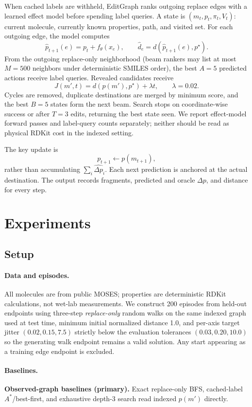 When cached labels are withheld, EditGraph ranks outgoing replace edges with a learned effect model before spending label queries. A state is $(m_t,p_t,\pi_t,V_t)$: current molecule, currently known properties, path, and visited set. For each outgoing edge, the model computes
\[
\widehat p_{t+1}(e)=p_t+f_\theta(x_e),\qquad
\widehat d_e=d(\widehat p_{t+1}(e),p^\star).
\]
From the outgoing replace-only neighborhood (beam rankers may list at most $M{=}500$ neighbors under deterministic SMILES order), the best $A{=}5$ predicted actions receive label queries. Revealed candidates receive
\[
J(m',t)=d(p(m'),p^\star)+\lambda t,\qquad \lambda=0.02.
\]
Cycles are removed, duplicate destinations are merged by minimum score, and the best $B=5$ states form the next beam. Search stops on coordinate-wise success or after $T=3$ edits, returning the best state seen. We report effect-model forward passes and label-query counts separately; neither should be read as physical RDKit cost in the indexed setting.

The key update is
\[
p_{t+1}\leftarrow p(m_{t+1}),
\]
rather than accumulating $\sum_i\widehat{\Delta p}_i$. Each next prediction is anchored at the actual destination. The output records fragments, predicted and oracle $\Delta p$, and distance for every step.

\section{Experiments}
\label{sec:experiments}

\subsection{Setup}

\paragraph{Data and episodes.}
All molecules are from public MOSES; properties are deterministic RDKit calculations, not wet-lab measurements. We construct 200 episodes from held-out endpoints using three-step \emph{replace-only} random walks on the same indexed graph used at test time, minimum initial normalized distance 1.0, and per-axis target jitter $(0.02,0.15,7.5)$ strictly below the evaluation tolerances $(0.03,0.20,10.0)$ so the generating walk endpoint remains a valid solution. Any start appearing as a training edge endpoint is excluded.

\paragraph{Baselines.}
\textbf{Observed-graph baselines (primary).} Exact replace-only BFS, cached-label $A^\ast$/best-first, and exhaustive depth-3 search read indexed $p(m')$ directly.

